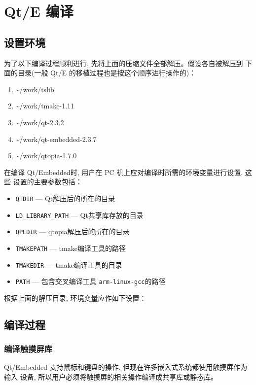 \section{Qt/E 编译}
\subsection{设置环境}
为了以下编译过程顺利进行, 先将上面的压缩文件全部解压。假设各自被解压到
下面的目录(一般 Qt/E 的移植过程也是按这个顺序进行操作的)：
\begin{enumerate}
    \item \textasciitilde/work/tslib
    \item \textasciitilde/work/tmake-1.11
    \item \textasciitilde/work/qt-2.3.2
    \item \textasciitilde/work/qt-embedded-2.3.7
    \item \textasciitilde/work/qtopia-1.7.0
\end{enumerate}

在编译 Qt/Embedded时, 用户在 PC 机上应对编译时所需的环境变量进行设置, 这些
设置的主要参数包括：
\begin{itemize}
    \item \verb|QTDIR| --- Qt解压后的所在的目录
    \item \verb|LD_LIBRARY_PATH| --- Qt共享库存放的目录
    \item \verb|QPEDIR| --- qtopia解压后的所在的目录
    \item \verb|TMAKEPATH| --- tmake编译工具的路径
    \item \verb|TMAKEDIR| --- tmake编译工具的目录
    \item \verb|PATH| --- 包含交叉编译工具 \verb|arm-linux-gcc|的路径
\end{itemize}

根据上面的解压目录, 环境变量应作如下设置：

\subsection{编译过程}
\subsubsection{编译触摸屏库}
Qt/Embedded 支持鼠标和键盘的操作, 但现在许多嵌入式系统都使用触摸屏作为输入
设备, 所以用户必须将触摸屏的相关操作编译成共享库或静态库。


